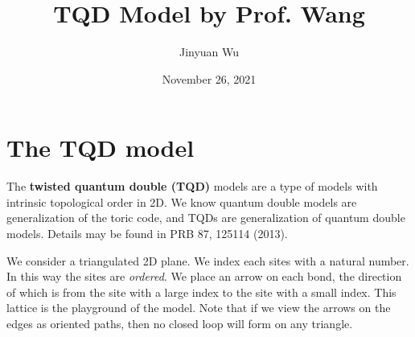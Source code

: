 \documentclass[hyperref, a4paper]{article}
\title{TQD Model by Prof. Wang}
\author{Jinyuan Wu}
\date{November 26, 2021}
\newcommand*{\concept}[1]{{\textbf{#1}}}
\begin{document}
\maketitle

\section{The TQD model}

The \concept{twisted quantum double (TQD)} models are a type of models with intrinsic topological order in 2D. 
We know quantum double models are generalization of the toric code, and TQDs are generalization of quantum 
double models. Details may be found in PRB 87, 125114 (2013).

We consider a triangulated 2D plane. We index each sites with a natural number. In this way the sites are 
\emph{ordered}. We place an arrow on each bond, the direction of which is from the site with a large index
to the site with a small index. This lattice is the playground of the model.
Note that if we view the arrows on the edges as oriented paths, then no closed loop will form on any triangle.
\end{document}
